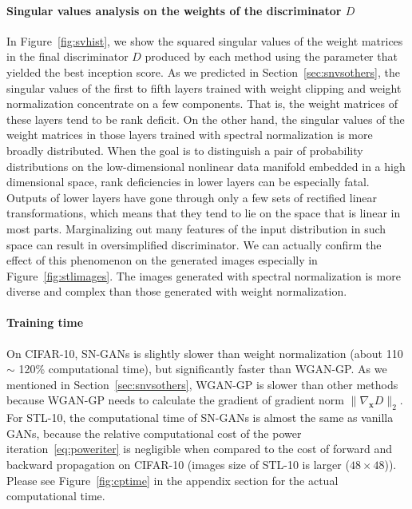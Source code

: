 \documentclass{article}
\newcommand{\bmx}{{\bm x}}
\begin{document}
\paragraph{Singular values analysis on the weights of the discriminator $D$}
In Figure~\ref{fig:svhist}, we show the squared singular values of the weight matrices in the final discriminator $D$ produced by each method using the parameter that yielded the best inception score.
As we predicted in Section~\ref{sec:snvsothers}, the singular values of the first to fifth layers trained with weight clipping and weight normalization concentrate on a few components.
That is, the weight matrices of these layers tend to be rank deficit.
On the other hand, the singular values of the weight matrices in those layers trained with spectral normalization is more broadly distributed.
When the goal is to distinguish a pair of probability distributions on the low-dimensional nonlinear data manifold embedded in a high dimensional space, rank deficiencies in lower layers can be especially fatal.
Outputs of lower layers have gone through only a few sets of rectified linear transformations, which means that they tend to lie on the space that is linear in most parts.
Marginalizing out many features of the input distribution in such space can result in oversimplified discriminator.
We can actually confirm the effect of this phenomenon on the generated images especially in Figure~\ref{fig:stlimages}.
The images generated with spectral normalization is more diverse and complex than those generated with weight normalization.
%
\paragraph{Training time}
On CIFAR-10, SN-GANs is slightly slower than weight normalization (about 110 $\sim$ 120\% computational time), but significantly faster than WGAN-GP. 
As we mentioned in Section~\ref{sec:snvsothers}, WGAN-GP is slower than other methods because WGAN-GP needs to calculate the gradient of gradient norm $\|\nabla_{\bmx} D\|_2$.
For STL-10, the computational time of SN-GANs is almost the same as vanilla GANs, because the relative computational cost of the power iteration~\eqref{eq:poweriter} is negligible when compared to the cost of forward and backward propagation on CIFAR-10 (images size of STL-10 is larger ($48 \times 48$)).
Please see Figure~\ref{fig:cptime} in the appendix section for the actual computational time.
\end{document}
